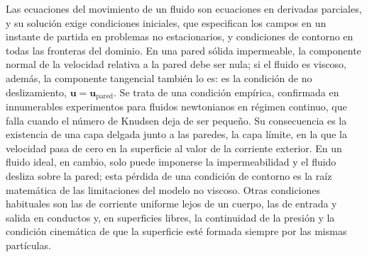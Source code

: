 \documentclass[10pt,openany]{book}
\begin{document}
Las ecuaciones del movimiento de un fluido son ecuaciones en derivadas parciales, y su solución exige condiciones iniciales, que especifican los campos en un instante de partida en problemas no estacionarios, y condiciones de contorno en todas las fronteras del dominio. En una pared sólida impermeable, la componente normal de la velocidad relativa a la pared debe ser nula; si el fluido es viscoso, además, la componente tangencial también lo es: es la condición de no deslizamiento, \(\mathbf{u} = \mathbf{u}_{\mathrm{pared}}\). Se trata de una condición empírica, confirmada en innumerables experimentos para fluidos newtonianos en régimen continuo, que falla cuando el número de Knudsen deja de ser pequeño. Su consecuencia es la existencia de una capa delgada junto a las paredes, la capa límite, en la que la velocidad pasa de cero en la superficie al valor de la corriente exterior. En un fluido ideal, en cambio, solo puede imponerse la impermeabilidad y el fluido desliza sobre la pared; esta pérdida de una condición de contorno es la raíz matemática de las limitaciones del modelo no viscoso. Otras condiciones habituales son las de corriente uniforme lejos de un cuerpo, las de entrada y salida en conductos y, en superficies libres, la continuidad de la presión y la condición cinemática de que la superficie esté formada siempre por las mismas partículas.
\end{document}
